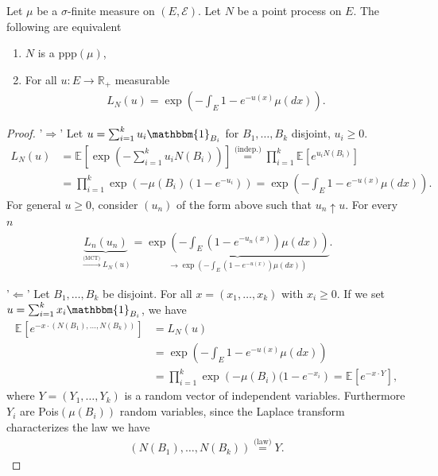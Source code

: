 \begin{theorem}
	Let $\mu$ be a $\sigma$-finite measure on $(E, \mathcal{E})$. Let $N$ be a point process on $E$. The following are equivalent
\begin{enumerate}
	\item $N$ is a ppp$(\mu)$, 
	\item For all $u:E \to \mathbb{R}_+$ measurable 
		\begin{align}
			L_N(u) = \exp\left(- \int_E 1- e^{-u(x)} \mu (dx)\right).
		\end{align}
\end{enumerate}
\end{theorem}
\begin{proof}
	'$\Longrightarrow$'
	Let $u=\sum_{i=1}^{k} u_i \mathbbm{1}_{B_i} $ for $B_1,\ldots , B_k$ disjoint, $u_i\geq 0$.
	\begin{align}
		L_{N}(u) &= \mathbb{E}_{} \left[ \exp \left( - \sum_{i=1}^{k} u_iN(B_i) \right) \right]  \stackrel{\textrm{(indep.)}}{=} \prod_{i=1}^{k}\mathbb{E}_{} \left[ e^{u_iN(B_i)} \right] \\
			 &=\prod_{i=1}^{k} \exp\left( -\mu (B_i) (1-e^{-u_i}) \right) = \exp \left( - \int_{E}^{} 1-e^{-u(x)}\mu (dx) \right).
	\end{align}
	For general $u\geq 0$, consider $(u_n)$ of the form above such that $u_n \uparrow u$. For every $n$ 
	\begin{align}
		\underbrace{L_n(u_n)}_{\stackrel{\textrm{(MCT)}}{\to}L_N(u)} = \underbrace{\exp \left( - \int_{E}^{} (1-e^{-u_n(x)})\mu (dx) \right)}_{\to \exp\left( - \int_{E}^{} (1-e^{-u(x)}) \mu (dx)\right)}.
	\end{align}

	'$\Longleftarrow$'
	Let $B_1,\ldots , B_k$ be disjoint. For all $x=(x_1,\ldots ,x_k)$ with $x_i\geq 0$. {\color{blue}If we set $u= \sum_{i=1}^{k} x_i \mathbbm{1}_{B_i} $, we have}
\begin{align}
	\mathbb{E}_{} \left[ e^{-x \cdot (N(B_1),\ldots ,N(B_k))} \right] &= L_{N}(u) \\
									  &= \exp \left( - \int_{E}^{} 1 - e^{-u(x)}\mu (dx) \right) \\
									  &= \prod_{i=1}^{k}\exp \left(-\mu (B_i) (1- e^{-x_i} \right) = \mathbb{E}_{} \left[ e^{-x \cdot Y} \right] ,
\end{align}
where $Y=(Y_1, \ldots , Y_k)$ is a random vector of independent variables. Furthermore $Y_i$ are Pois$(\mu (B_i))$ random variables, since the Laplace transform characterizes the law we have
\begin{align}
	(N(B_1), \ldots ,N(B_k)) \stackrel{\textrm{(law)}}{=} Y.
\end{align}
\end{proof}

